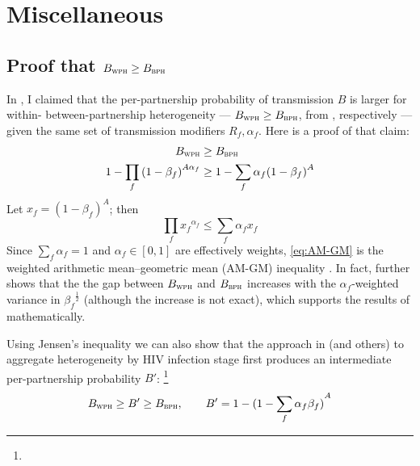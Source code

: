 \section{Miscellaneous}\label{app.math.misc}
\subsection{Proof that $B_{\textsc{wph}} \ge B_{\textsc{bph}}$}\label{app.math.misc.xph}
In , I claimed that
the per-partnership probability of transmission $B$ is larger for
within- \vs between-partnership heterogeneity
--- $B_{\textsc{wph}} \ge B_{\textsc{bph}}$, from , respectively ---
given the same set of transmission modifiers $R_f, \alpha_f$.
Here is a proof of that claim:
\begin{equation}
  \begin{aligned}
    B_{\textsc{wph}} &\ge B_{\textsc{bph}} \\
    1 - \prod_f {(1 - \beta_f)}^{A\alpha_f} &\ge 1 - \sum_f \alpha_f {(1 - \beta_f)}^{A}
  \end{aligned}
\end{equation}
Let $x_f = {(1 - \beta_f)}^A$; then
\begin{equation}\label{eq:AM-GM}
  \prod_f {x_f}^{\alpha_f} \le \sum_f \alpha_f x_f
\end{equation}
Since $\sum_f \alpha_f = 1$ and $\alpha_f \in [0,1]$ are effectively weights,
\eqref{eq:AM-GM} is the weighted arithmetic mean--geometric mean (AM-GM) inequality \cite{Aldaz2009}.
In fact, \citet{Aldaz2009} further shows that the the gap between $B_{\textsc{wph}}$ and $B_{\textsc{bph}}$
increases with the $\alpha_f$-weighted variance in ${\beta_f}^{\frac12}$
(although the increase is not exact),
which supports the results of  mathematically.
\par
Using Jensen's inequality \cite{Jensen1906} we can also show that
the approach in \cite{Kerr2015} (and others)
to aggregate heterogeneity by HIV infection stage first
produces an intermediate per-partnership probability $B'$:%
\footnote{}
\begin{equation}
  B_{\textsc{wph}} \ge B' \ge B_{\textsc{bph}},
  \qquad B' = 1 - {(1 - \sum_f \alpha_f \beta_f)}^{A}
\end{equation}
